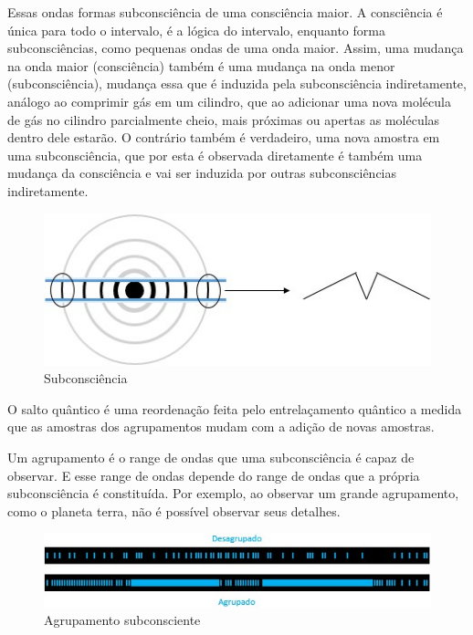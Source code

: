 Essas ondas formas subconsciência de uma consciência maior. A consciência é única para todo o intervalo, é a lógica do intervalo, enquanto forma subconsciências, como pequenas ondas de uma onda maior. Assim, uma mudança na onda maior (consciência) também é uma mudança na onda menor (subconsciência), mudança essa que é induzida pela subconsciência indiretamente, análogo ao comprimir gás em um cilindro, que ao adicionar uma nova molécula de gás no cilindro parcialmente cheio, mais próximas ou apertas as moléculas dentro dele estarão. O contrário também é verdadeiro, uma nova amostra em uma subconsciência, que por esta é observada diretamente é também uma mudança da consciência e vai ser induzida por outras subconsciências indiretamente.
	\begin{figure}[H]
	\caption{Subconsciência}
	\label{fig:consciousness_subconscious}
	\centering
	\includegraphics[scale=1]{sections/images/consciousness_subconscious.jpg}
	\end{figure}

O salto quântico é uma reordenação feita pelo entrelaçamento quântico a medida que as amostras dos agrupamentos mudam com a adição de novas amostras.

Um agrupamento é o range de ondas que uma subconsciência é capaz de observar. E esse range de ondas depende do range de ondas que a própria subconsciência é constituída. Por exemplo, ao observar um grande agrupamento, como o planeta terra, não é possível observar seus detalhes.
	\begin{figure}[H]
	\caption{Agrupamento subconsciente}
	\label{fig:consciousness_space_subconscious_grouping}
	\centering
	\includegraphics[scale=.8]{sections/images/consciousness_space_subconscious_grouping.jpg}
	\end{figure}

